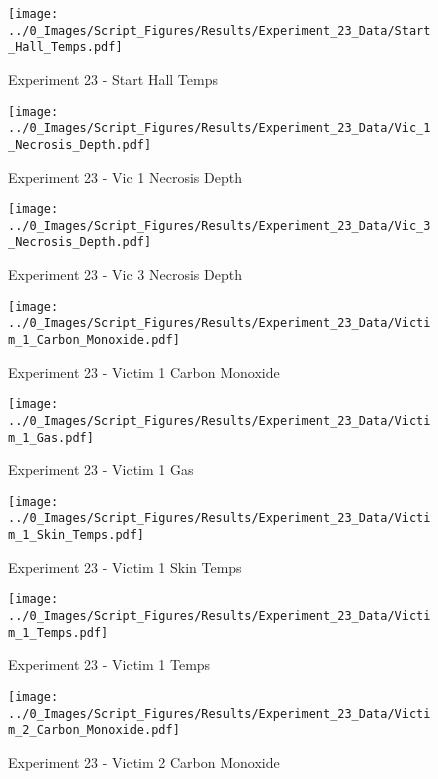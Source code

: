 	\clearpage

	\begin{figure}[H]
		\centering
		\texttt{[image: ../0\_Images/Script\_Figures/Results/Experiment\_23\_Data/Start\_Hall\_Temps.pdf]}
		\caption[]{Experiment 23 - Start Hall Temps}
	\end{figure}
 

	\begin{figure}[H]
		\centering
		\texttt{[image: ../0\_Images/Script\_Figures/Results/Experiment\_23\_Data/Vic\_1\_Necrosis\_Depth.pdf]}
		\caption[]{Experiment 23 - Vic 1 Necrosis Depth}
	\end{figure}
 
	\clearpage

	\begin{figure}[H]
		\centering
		\texttt{[image: ../0\_Images/Script\_Figures/Results/Experiment\_23\_Data/Vic\_3\_Necrosis\_Depth.pdf]}
		\caption[]{Experiment 23 - Vic 3 Necrosis Depth}
	\end{figure}
 

	\begin{figure}[H]
		\centering
		\texttt{[image: ../0\_Images/Script\_Figures/Results/Experiment\_23\_Data/Victim\_1\_Carbon\_Monoxide.pdf]}
		\caption[]{Experiment 23 - Victim 1 Carbon Monoxide}
	\end{figure}
 
	\clearpage

	\begin{figure}[H]
		\centering
		\texttt{[image: ../0\_Images/Script\_Figures/Results/Experiment\_23\_Data/Victim\_1\_Gas.pdf]}
		\caption[]{Experiment 23 - Victim 1 Gas}
	\end{figure}
 

	\begin{figure}[H]
		\centering
		\texttt{[image: ../0\_Images/Script\_Figures/Results/Experiment\_23\_Data/Victim\_1\_Skin\_Temps.pdf]}
		\caption[]{Experiment 23 - Victim 1 Skin Temps}
	\end{figure}
 
	\clearpage

	\begin{figure}[H]
		\centering
		\texttt{[image: ../0\_Images/Script\_Figures/Results/Experiment\_23\_Data/Victim\_1\_Temps.pdf]}
		\caption[]{Experiment 23 - Victim 1 Temps}
	\end{figure}
 

	\begin{figure}[H]
		\centering
		\texttt{[image: ../0\_Images/Script\_Figures/Results/Experiment\_23\_Data/Victim\_2\_Carbon\_Monoxide.pdf]}
		\caption[]{Experiment 23 - Victim 2 Carbon Monoxide}
	\end{figure}
 
